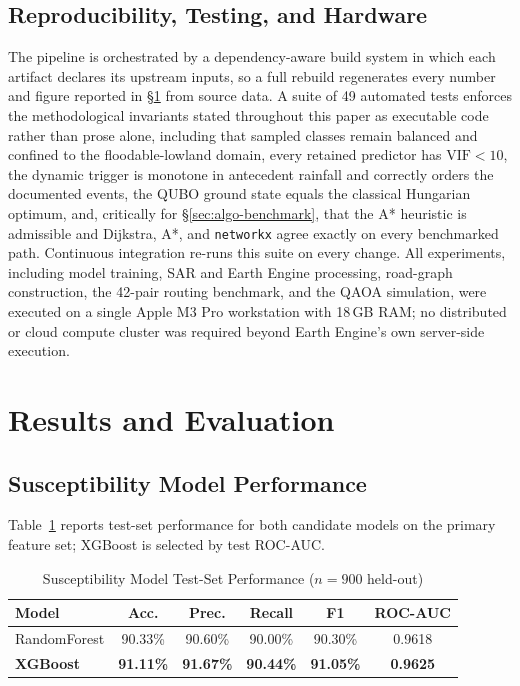 \documentclass[conference]{IEEEtran}
\begin{document}
\subsection{Reproducibility, Testing, and Hardware}
The pipeline is orchestrated by a dependency-aware build system in which each artifact declares its upstream inputs, so a full rebuild regenerates every number and figure reported in \S\ref{sec:results} from source data. A suite of 49 automated tests enforces the methodological invariants stated throughout this paper as executable code rather than prose alone, including that sampled classes remain balanced and confined to the floodable-lowland domain, every retained predictor has $\mathrm{VIF}<10$, the dynamic trigger is monotone in antecedent rainfall and correctly orders the documented events, the QUBO ground state equals the classical Hungarian optimum, and, critically for \S\ref{sec:algo-benchmark}, that the A* heuristic is admissible and Dijkstra, A*, and \texttt{networkx} agree exactly on every benchmarked path. Continuous integration re-runs this suite on every change. All experiments, including model training, SAR and Earth Engine processing, road-graph construction, the 42-pair routing benchmark, and the QAOA simulation, were executed on a single Apple M3 Pro workstation with 18\,GB RAM; no distributed or cloud compute cluster was required beyond Earth Engine's own server-side execution.

\section{Results and Evaluation}
\label{sec:results}

\subsection{Susceptibility Model Performance}
Table~\ref{tab:model} reports test-set performance for both candidate models on the primary feature set; XGBoost is selected by test ROC-AUC.

\begin{table}[t]
\caption{Susceptibility Model Test-Set Performance ($n{=}900$ held-out)}
\label{tab:model}
\centering
\begin{tabular}{|l|c|c|c|c|c|}
\hline
Model & Acc. & Prec. & Recall & F1 & ROC-AUC \\
\hline
RandomForest & 90.33\% & 90.60\% & 90.00\% & 90.30\% & 0.9618 \\
\hline
\textbf{XGBoost} & \textbf{91.11\%} & \textbf{91.67\%} & \textbf{90.44\%} & \textbf{91.05\%} & \textbf{0.9625} \\
\hline
\end{tabular}
\end{table}
\end{document}
